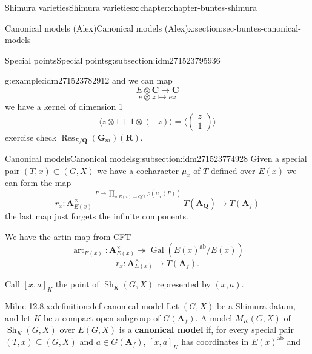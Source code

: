 \documentclass[oneside,10pt,]{book}
\newcommand{\terminology}[1]{\textbf{#1}}
\numberwithin{equation}{section}
\newcommand{\lb}{[}
\newcommand{\rb}{]}
\newcommand{\QQ}{\mathbf{Q}}
\newcommand{\RR}{\mathbf{R}}
\newcommand{\CC}{\mathbf{C}}
\newcommand{\adeles}{\mathbf{A}}
\newcommand{\alg}{\mathrm{alg}}
\newcommand{\ab}{\mathrm{ab}}
\newcommand{\Gal}[2]{\operatorname{Gal}(#1/#2)}
\DeclareMathOperator{\Res}{Res}
\begin{document}
\begin{chapterptx}{Shimura varieties}{}{Shimura varieties}{}{}{x:chapter:chapter-buntes-shimura}
\begin{sectionptx}{Canonical models (Alex)}{}{Canonical models (Alex)}{}{}{x:section:sec-buntes-canonical-models}
\begin{subsectionptx}{Special points}{}{Special points}{}{}{g:subsection:idm271523795936}
\begin{example}{}{g:example:idm271523782912}
and we can map%
\begin{equation*}
E\otimes \CC \to \CC
\end{equation*}
%
\begin{equation*}
e\otimes z \mapsto ez
\end{equation*}
we have a kernel of dimension 1%
\begin{equation*}
\langle z \otimes 1 + 1\otimes (-z) \rangle = \langle \begin{pmatrix} z \\ 1 \end{pmatrix}\rangle
\end{equation*}
exercise check \(\Res_{E/\QQ}(\mathbf G_m)(\RR)\).%
\end{example}
\end{subsectionptx}
%
%
\typeout{************************************************}
\typeout{************************************************}
%
\begin{subsectionptx}{Canonical models}{}{Canonical models}{}{}{g:subsection:idm271523774928}
Given a special pair \((T,x) \subset (G,X)\) we have a cocharacter \(\mu_x\) of \(T\) defined over \(E(x)\) we can form the map%
\begin{equation*}
r_x \colon \adeles^\times_{E(x)} \xrightarrow{ P \mapsto \prod_{\rho \colon E(x) \to \QQ^\alg} \rho(\mu_x(P)) } T(\adeles_\QQ) \to T(\adeles_f)
\end{equation*}
the last map just forgets the infinite components.%
\par
We have the artin map from CFT%
\begin{equation*}
{\operatorname{art}}_{E(x)} \colon \adeles^\times_{E(x)} \twoheadrightarrow \Gal{E(x)^\ab}{E(x)}
\end{equation*}
%
\begin{equation*}
r_x \colon \adeles^\times_{E(x)} \to T(\adeles_f)\text{.}
\end{equation*}
%
\par
Call \(\lb x,a\rb_K\) the point of \({\operatorname{Sh}}_K(G,X)\) represented by \((x,a)\).%
\begin{definition}{Milne 12.8.}{x:definition:def-canonical-model}%
Let \((G,X)\) be a Shimura datum, and let \(K\) be a compact open subgroup of \(G(\adeles_f)\). A model \(M_K(G,X)\) of \({\operatorname{Sh}}_K(G,X)\) over \(E(G,X)\) is a \terminology{canonical model} if, for every special pair \((T, x) \subseteq (G,X)\) and \(a \in G(\adeles_f)\), \(\lb x,a\rb _K\) has coordinates in \(E(x)^\ab\) and%

\end{definition}
\end{subsectionptx}
\end{sectionptx}
\end{chapterptx}
\end{document}
